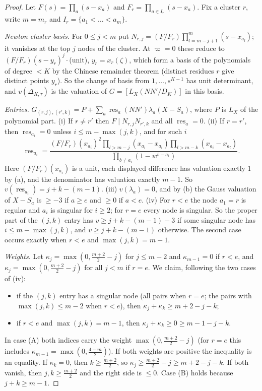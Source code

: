 \documentclass[11pt]{amsart}
\theoremstyle{definition}
\theoremstyle{remark}
\numberwithin{equation}{section}
\newcommand{\Res}{\operatorname{res}}
\begin{document}
\begin{proof}
Let $F(s)=\prod_a(s-x_a)$ and $F_r=\prod_{a\in I_r}(s-x_a)$. Fix a cluster $r$, write $m=m_r$ and
$I_r=\{a_1<\dots<a_m\}$.

\emph{Newton cluster basis.} For $0\le j<m$ put $N_{r,j}=(F/F_r)\prod_{l=m-j+1}^m(s-x_{a_l})$; it vanishes at the top
$j$ nodes of the cluster. At $\varpi=0$ these reduce to $(F/F_r)(s-y_r)^j\cdot$(unit), $y_r=x_r(\zeta)$, which form a
basis of the polynomials of degree $<K$ by the Chinese remainder theorem (distinct residues $r$ give distinct points
$y_r$). So the change of basis from $1,\dots,s^{K-1}$ has unit determinant, and $v(\Delta_{K,\tau})$ is the valuation of
$G=[L_X(NN'/D_K)]$ in this basis.

\emph{Entries.} $G_{(r,j),(r',k)}=P+\sum_a\Res_a(NN')\lambda_a(X-S_a)$, where $P$ is $L_X$ of the polynomial part.
(i) If $r\ne r'$ then $F\mid N_{r,j}N_{r',k}$ and all $\Res_a=0$.
(ii) If $r=r'$, then $\Res_{a_i}=0$ unless $i\le m-\max(j,k)$, and for such $i$
\[
\Res_{a_i}=\frac{(F/F_r)(x_{a_i})^2\prod_{l>m-j}(x_{a_i}-x_{a_l})\prod_{l>m-k}(x_{a_i}-x_{a_l})}
{\prod_{b\ne a_i}(1-w^{b-a_i})}.
\]
Here $(F/F_r)(x_{a_i})$ is a unit, each displayed difference has valuation exactly $1$ by (a), and the denominator has
valuation exactly $m-1$. So $v(\Res_{a_i})=j+k-(m-1)$.
(iii) $v(\lambda_a)=0$, and by (b) the Gauss valuation of $X-S_a$ is $\ge-3$ if $a\ge e$ and $\ge0$ if $a<e$.
(iv) For $r<e$ the node $a_1=r$ is regular and $a_i$ is singular for $i\ge2$; for $r=e$ every node is singular. So the
proper part of the $(j,k)$ entry has $v\ge j+k-(m-1)-3$ if some singular node has $i\le m-\max(j,k)$, and
$v\ge j+k-(m-1)$ otherwise. The second case occurs exactly when $r<e$ and $\max(j,k)=m-1$.

\emph{Weights.} Let $\kappa_j=\max(0,\tfrac{m+2}2-j)$ for $j\le m-2$ and $\kappa_{m-1}=0$ if $r<e$, and
$\kappa_j=\max(0,\tfrac{m+2}2-j)$ for all $j<m$ if $r=e$. We claim, following the two cases of (iv):
\begin{itemize}
\item[(A)] if the $(j,k)$ entry has a singular node (all pairs when $r=e$; the pairs with $\max(j,k)\le m-2$ when
$r<e$), then $\kappa_j+\kappa_k\ge m+2-j-k$;
\item[(B)] if $r<e$ and $\max(j,k)=m-1$, then $\kappa_j+\kappa_k\ge0\ge m-1-j-k$.
\end{itemize}
In case (A) both indices carry the weight $\max(0,\tfrac{m+2}2-j)$ (for $r=e$ this includes
$\kappa_{m-1}=\max(0,\tfrac{4-m}2)$). If both weights are positive the inequality is an equality. If $\kappa_k=0$, then
$k\ge\frac{m+2}2$, so $\kappa_j\ge\frac{m+2}2-j\ge m+2-j-k$. If both vanish, then $j,k\ge\frac{m+2}2$ and the right side
is $\le0$. Case (B) holds because $j+k\ge m-1$.


\end{proof}
\end{document}
